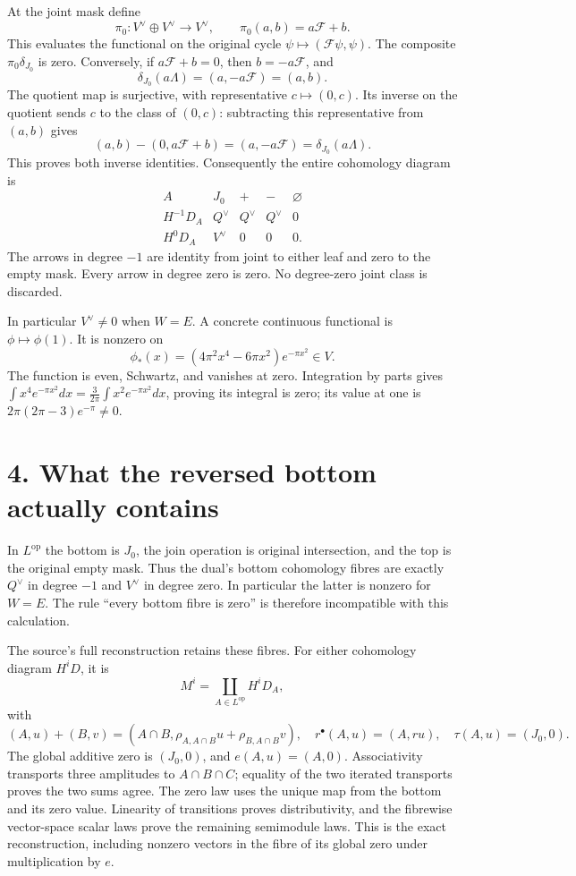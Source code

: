 \documentclass[10pt,a4paper,oneside]{report}
\begin{document}
At the joint mask define \[
\pi_0:V^\vee\oplus V^\vee\longrightarrow V^\vee,
\qquad\pi_0(a,b)=a\mathcal F+b.
\] This evaluates the functional on the original cycle
\(\psi\mapsto(\mathcal F\psi,\psi)\). The composite
\(\pi_0\delta_{J_0}\) is zero. Conversely, if \(a\mathcal F+b=0\), then
\(b=-a\mathcal F\), and \[
\delta_{J_0}(a\Lambda)=(a,-a\mathcal F)=(a,b).
\] The quotient map is surjective, with representative
\(c\mapsto(0,c)\). Its inverse on the quotient sends \(c\) to the class
of \((0,c)\): subtracting this representative from \((a,b)\) gives \[
(a,b)-(0,a\mathcal F+b)=(a,-a\mathcal F)=\delta_{J_0}(a\Lambda).
\] This proves both inverse identities. Consequently the entire
cohomology diagram is \[
\begin{array}{c|cccc}
A&J_0&+&-&\varnothing\\ \hline
H^{-1}D_A&Q^\vee&Q^\vee&Q^\vee&0\\
H^0D_A&V^\vee&0&0&0.
\end{array}
\] The arrows in degree \(-1\) are identity from joint to either leaf
and zero to the empty mask. Every arrow in degree zero is zero. No
degree-zero joint class is discarded.

In particular \(V^\vee\ne0\) when \(W=E\). A concrete continuous
functional is \(\phi\mapsto\phi(1)\). It is nonzero on \[
\phi_*(x)=(4\pi^2x^4-6\pi x^2)e^{-\pi x^2}\in V.
\] The function is even, Schwartz, and vanishes at zero. Integration by
parts gives
\(\int x^4e^{-\pi x^2}dx=\frac{3}{2\pi}\int x^2e^{-\pi x^2}dx\), proving
its integral is zero; its value at one is \(2\pi(2\pi-3)e^{-\pi}\ne0\).

\section{4. What the reversed bottom actually
contains}\label{proof03:what-the-reversed-bottom-actually-contains}

In \(L^{\mathrm{op}}\) the bottom is \(J_0\), the join operation is
original intersection, and the top is the original empty mask. Thus the
dual's bottom cohomology fibres are exactly \(Q^\vee\) in degree \(-1\)
and \(V^\vee\) in degree zero. In particular the latter is nonzero for
\(W=E\). The rule ``every bottom fibre is zero'' is therefore
incompatible with this calculation.

The source's full reconstruction retains these fibres. For either
cohomology diagram \(H^iD\), it is \[
M^i=\coprod_{A\in L^{\mathrm{op}}}H^iD_A,
\] with \[
(A,u)+(B,v)=
(A\cap B,\rho_{A,A\cap B}u+\rho_{B,A\cap B}v),
\quad
r^\bullet(A,u)=(A,ru),
\quad
\tau(A,u)=(J_0,0).
\] The global additive zero is \((J_0,0)\), and \(e(A,u)=(A,0)\).
Associativity transports three amplitudes to \(A\cap B\cap C\); equality
of the two iterated transports proves the two sums agree. The zero law
uses the unique map from the bottom and its zero value. Linearity of
transitions proves distributivity, and the fibrewise vector-space scalar
laws prove the remaining semimodule laws. This is the exact
reconstruction, including nonzero vectors in the fibre of its global
zero under multiplication by \(e\).
\end{document}
